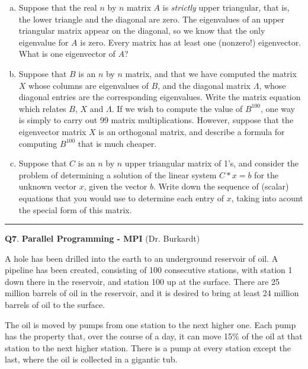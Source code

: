 \documentclass[11pt,letterpaper]{article}
\newcommand{\highlight}[1]{\textcolor{BrickRed}{#1}}
\begin{document}
\begin{enumerate}[a)]


\item Suppose that the real $n$ by $n$ matrix $A$ is {\it{strictly}} upper triangular,
that is, the lower triangle and the diagonal are zero.  The eigenvalues of an upper
triangular matrix appear on the diagonal, so we know that the only eigenvalue for
$A$ is zero.  Every matrix has at least one (nonzero!) eigenvector. 
What is one eigenvector of $A$?
\item Suppose that $B$ is an $n$ by $n$ matrix, and that we have computed
the matrix $X$ whose columns are eigenvalues of $B$, and the diagonal matrix
$\Lambda$, whose diagonal entries are the corresponding eigenvalues.
Write the matrix equation which relates $B$, $X$ and $\Lambda$.
If we wish to compute the value of $B^{100}$, one way is simply to carry
out 99 matrix multiplications.  However, suppose that the eigenvector
matrix $X$ is an orthogonal matrix, and describe a formula for computing
$B^{100}$ that is much cheaper.
\item Suppose that $C$ is an $n$ by $n$ upper triangular matrix of 1's,
and consider the problem of determining a solution of the linear system $C*x=b$
for the unknown vector $x$, given the vector $b$.  Write down the sequence
of (scalar) equations that you would use to determine each entry of $x$,
taking into acount the special form of this matrix.

\end{enumerate}


\pagebreak
\hrule 
\medskip
\textbf{Q7}. \highlight{\textbf{Parallel Programming - MPI}} (Dr. Burkardt)
\label{q7}
\bigskip

A hole has been drilled into the earth to an underground reservoir of oil.  A pipeline has been created, consisting of 100 consecutive stations, with station 1 down there in the reservoir, and station 100 up at the surface.  There are 25 million barrels of oil in the reservoir, and it is desired to bring at least 24 million barrels of oil to the surface.

\medskip

The oil is moved by pumps from one station to the next higher one. Each pump has the property that, over the course of a day, it can move 15\% of the oil at that station to the next higher station.  There is a pump at every station except the last, where the oil is collected in a gigantic tub.  
\end{document}
